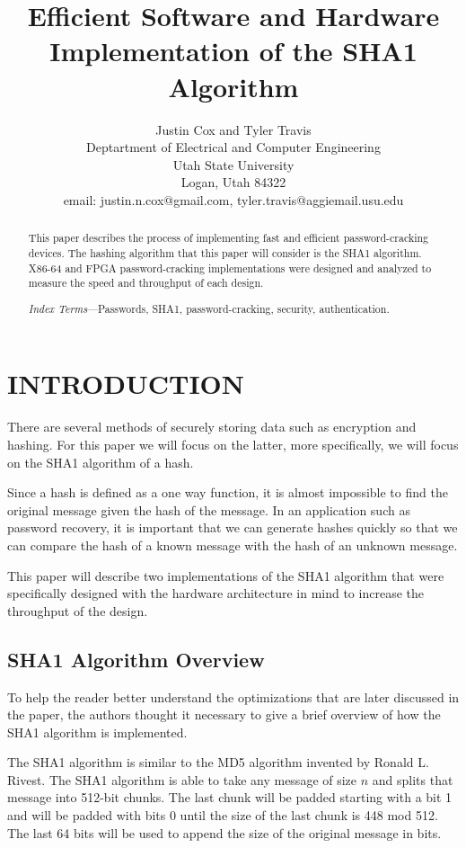 \documentclass[letterpaper, 10 pt, conference]{ieeeconf}  %
\title{\LARGE \bf
Efficient Software and Hardware Implementation of the SHA1 Algorithm
}
\author{Justin Cox and Tyler Travis
\\ \small{Deptartment of Electrical and Computer Engineering}
\\ \small{Utah State University}
\\ \small{Logan, Utah 84322}
\\ \small{email: justin.n.cox@gmail.com, tyler.travis@aggiemail.usu.edu}
}
\begin{document}
\maketitle
\thispagestyle{empty}
\pagestyle{empty}


\begin{abstract}

This paper describes the process of implementing fast and efficient password-cracking devices.  The hashing algorithm that this paper will consider is the SHA1 algorithm.  X86-64 and FPGA password-cracking implementations were designed and analyzed to measure the speed and throughput of each design.

\emph{Index Terms}---Passwords, SHA1, password-cracking, security,  authentication.    

\end{abstract}

\section{INTRODUCTION}

There are several methods of securely storing data such as encryption and hashing.  For this paper we will focus on the latter, more specifically, we will focus on the SHA1 algorithm of a hash.

Since a hash is defined as a one way function, it is almost impossible to find the original message given the hash of the message.  In an application such as password recovery, it is important that we can generate hashes quickly so that we can compare the hash of a known message with the hash of an unknown message.

This paper will describe two implementations of the SHA1 algorithm that were specifically designed with the hardware architecture in mind to increase the throughput of the design.

\subsection{SHA1 Algorithm Overview}

To help the reader better understand the optimizations that are later discussed in the paper, the authors thought it necessary to give a brief overview of how the SHA1 algorithm is implemented.

The SHA1 algorithm is similar to the MD5 algorithm invented by Ronald L. Rivest.  The SHA1 algorithm is able to take any message of size $n$ and splits that message into 512-bit chunks.  The last chunk will be padded starting with a bit 1 and will be padded with bits 0 until the size of the last chunk is 448 mod 512.  The last 64 bits will be used to append the size of the original message in bits.
\end{document}
